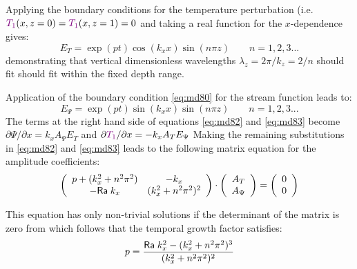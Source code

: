 \vspace{0.5cm}
\vspace{0.5cm}

Applying the boundary conditions for the temperature perturbation 
(i.e. $ {\color{violet}T_1}(x,z=0)= {\color{violet}T_1}(x,z=1)=0$
and taking a real function for the $x$-dependence gives:
\begin{equation}
E_T = \exp (pt) \cos (k_x x) \sin (n\pi z) \qquad n=1,2,3...
\label{eq:md85}
\end{equation}
demonstrating that vertical dimensionless wavelengths
$\lambda_z = 2\pi/k_z = 2/n$ should fit should fit within the fixed depth range.

Application of the boundary condition \eqref{eq:md80} for the stream function leads to:
\begin{equation}
E_\Psi = \exp (pt) \sin (k_x x) \sin (n\pi z) \qquad n=1,2,3...
\label{eq:md86}
\end{equation}
The terms at the right hand side of equations \eqref{eq:md82} and \eqref{eq:md83} become
$\partial \Psi/\partial x = k_x A_\Psi E_T$ and 
$\partial {\color{violet}T_1}/\partial x = -k_x A_T E_\Psi$
Making the remaining substitutions in \eqref{eq:md82} and \eqref{eq:md83} leads to the
following matrix equation for the amplitude coefficients:
\begin{equation}
\left(
\begin{array}{cc}
p + (k_x^2+ n^2 \pi^2) & -k_x \\
-{\mathsf{Ra}} \; k_x & (k_x^2 + n^2 \pi^2)^2
\end{array}
\right)
\cdot
\left(
\begin{array}{cc}
A_T \\ A_\Psi
\end{array}
\right)
=
\left(
\begin{array}{cc}
 0 \\ 0
\end{array}
\right)
\label{eq:md87}
\end{equation}

This equation has only non-trivial solutions if the determinant of the matrix is zero from
which follows that the temporal growth factor satisfies:
\begin{equation}
p = \frac{{\mathsf{Ra}}\;  k_x^2 - (k_x^2+n^2 \pi^2)^3}{(k_x^2+n^2\pi^2)^2}
\label{eq:md88}
\end{equation}

